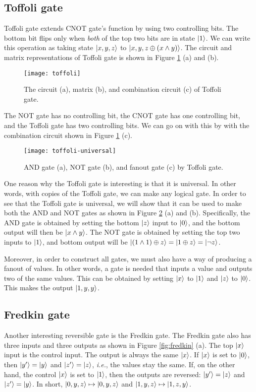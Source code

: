 \documentclass{easyclass}
\begin{document}
\subsection{Toffoli gate}
Toffoli gate extends CNOT gate's function by using two controlling bits. The bottom bit flips only when \textit{both} of the top two bits are in state $\ket{1}$. We can write this operation as taking state $\ket{x,y,z}$ to $\ket{x,y,z\oplus (x\wedge y)}$. The circuit and matrix representations of Toffoli gate is shown in Figure \ref{fig:toffoli} (a) and (b). 

\begin{figure}[h]
	\centering
	\texttt{[image: toffoli]}
	\caption{The circuit (a), matrix (b), and combination circuit (c) of Toffoli gate.}
	\label{fig:toffoli}
\end{figure}

The NOT gate has no controlling bit, the CNOT gate has one controlling bit, and the Toffoli gate has two controlling bits. We can go on with this by with the combination circuit shown in Figure \ref{fig:toffoli} (c). 

\begin{figure}[h]
	\centering
	\texttt{[image: toffoli-universal]}
	\caption{AND gate (a), NOT gate (b), and fanout gate (c) by Toffoli gate.}
	\label{fig:toffoli-universal}
\end{figure}

One reason why the Toffoli gate is interesting is that it is universal. In other words, with copies of the Toffoli gate, we can make any logical gate. In order to see that the Toffoli gate is universal, we will show that it can be used to make both the AND and NOT gates as shown in Figure \ref{fig:toffoli-universal} (a) and (b). Specifically, the AND gate is obtained by setting the bottom $\ket{z}$ input to $\ket{0}$, and the bottom output will then be $\ket{x\wedge y}$. The NOT gate is obtained by setting the top two inputs to $\ket{1}$, and bottom output will be $\ket{(1\wedge 1)\oplus z}=\ket{1\oplus z}=\ket{\neg z}$. 

Moreover, in order to construct all gates, we must also have a way of producing a fanout of values. In other words, a gate is needed that inputs a value and outputs two of the same values. This can be obtained by setting $\ket{x}$ to $\ket{1}$ and $\ket{z}$ to $\ket{0}$. This makes the output $\ket{1,y,y}$. 


\subsection{Fredkin gate}
Another interesting reversible gate is the Fredkin gate. The Fredkin gate also has three inputs and three outputs as shown in Figure \ref{fig:fredkin} (a). The top $\ket{x}$ input is the control input. The output is always the same $\ket{x}$. If $\ket{x}$
is set to $\ket{0}$, then $\ket{y'}=\ket{y}$ and $\ket{z'}=\ket{z}$, \textit{i.e.}, the values stay the same. If, on the other hand, the control $\ket{x}$ is set to $\ket{1}$, then the outputs are reversed: $\ket{y'}=\ket{z}$ and $\ket{z'}=\ket{y}$. In short, $\ket{0, y, z} \mapsto \ket{0,y,z}$ and $\ket{1, y, z} \mapsto \ket{1,z,y}$.
\end{document}
